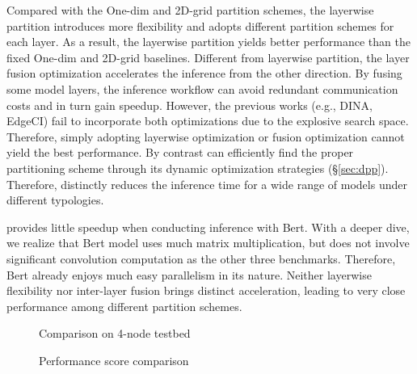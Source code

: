 Compared with the One-dim and 2D-grid partition schemes, the layerwise partition introduces more flexibility and adopts different partition schemes for each layer. As a result, the layerwise partition yields better performance than the fixed One-dim and 2D-grid baselines. Different from layerwise partition, the layer fusion optimization accelerates the inference from the other direction. By fusing some model layers, the inference workflow can avoid redundant communication costs and in turn gain speedup. However, the previous works (e.g., DINA, EdgeCI) fail to incorporate both optimizations due to the explosive search space. Therefore, simply adopting layerwise optimization or fusion optimization cannot yield the best performance. By contrast \sysname can efficiently find the proper partitioning scheme through its dynamic optimization strategies (\S\ref{sec:dpp}). Therefore, \sysname distinctly reduces the inference time for a wide range of models under different typologies. 

 \sysname provides little speedup when conducting inference with Bert. With a deeper dive, we realize that Bert model uses much matrix multiplication, but does not involve significant convolution computation as the other three benchmarks. Therefore, Bert already enjoys much easy parallelism in its nature. Neither layerwise flexibility nor inter-layer fusion brings distinct acceleration, leading to very close performance among different partition schemes.



\begin{figure*}[t]
	\centering
	\caption{Comparison on 4-node testbed}
	\label{Ring-4-node} 
\end{figure*}


\begin{figure*}[t]
	\centering
        \caption{Performance score comparison}
	\label{Score-4 and Score-4} 
\end{figure*}




